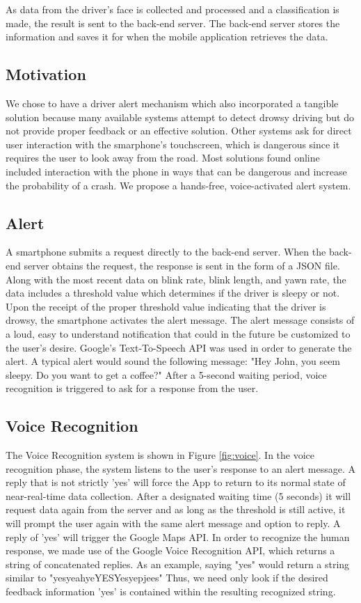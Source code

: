 \documentclass[twocolumn]{article}
\begin{document}
As data from the driver's face is collected and processed and a classification is made, the result is sent to the back-end server. The back-end server stores the information and saves it for when the mobile application retrieves the data. 
\subsection{Motivation}
We chose to have a driver alert mechanism which also incorporated a tangible solution because many available systems attempt to detect drowsy driving but do not provide proper feedback or an effective solution. Other systems ask for direct user interaction with the smarphone's touchscreen, which is dangerous since it requires the user to look away from the road. Most solutions found online included interaction with the phone in ways that can be dangerous and increase the probability of a crash. We propose a hands-free, voice-activated alert system. 
\subsection{Alert}
A smartphone submits a request directly to the back-end server. When the back-end server obtains the request, the response is sent in the form of a JSON file. Along with the most recent data on blink rate, blink length, and yawn rate, the data includes a threshold value which determines if the driver is sleepy or not. Upon the receipt of the proper threshold value indicating that the driver is drowsy, the smartphone activates the alert message. The alert message consists of a loud, easy to understand notification that could in the future be customized to the user's desire. Google's Text-To-Speech API was used in order to generate the alert. A typical alert would sound the following message: "Hey John, you seem sleepy. Do you want to get a coffee?" After a 5-second waiting period, voice recognition is triggered to ask for a response from the user.
\subsection{Voice Recognition}
The Voice Recognition system is shown in Figure \ref{fig:voice}. In the voice recognition phase, the system listens to the user's response to an alert message. A reply that is not strictly 'yes' will force the App to return to its normal state of near-real-time data collection. After a designated waiting time (5 seconds) it will request data again from the server and as long as the threshold is still active, it will prompt the user again with the same alert message and option to reply. A reply of 'yes' will trigger the Google Maps API. In order to recognize the human response, we made use of the Google Voice Recognition API, which returns a string of concatenated replies. As an example, saying "yes" would return a string similar to "yesyeahyeYESYesyepjees" Thus, we need only look if the desired feedback information 'yes' is contained within the resulting recognized string. 
\end{document}
